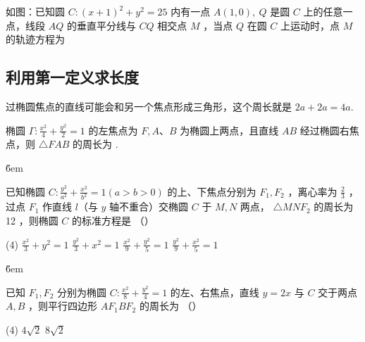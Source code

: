 \vspace{10em}

\begin{example}
    如图：已知圆 $C:(x+1)^2+y^2=25$ 内有一点 $A(1,0), ~ Q$ 是圆 $C$ 上的任意一点，线段 $A Q$ 的垂直平分线与 $C Q$ 相交点 $M$ ，当点 $Q$ 在圆 $C$ 上运动时，点 $M$ 的轨迹方程为 \underline{\qquad}
\end{example}

\begin{figure} [H]
    \centering
    \resizebox{0.25\textwidth}{!}{}
\end{figure}

\subsection{利用第一定义求长度}

\begin{theorem}[椭圆中的 $4a$ 周长]
    过椭圆焦点的直线可能会和另一个焦点形成三角形，这个周长就是 $2a + 2a = 4a$.
\end{theorem}

\begin{example}
    椭圆 $\Gamma: \frac{x^2}{4}+\frac{y^2}{2}=1$ 的左焦点为 $F,A $、$B$ 为椭圆上两点，且直线 $A B$ 经过椭圆右焦点，则 $\triangle F A B$ 的周长为 \underline{\qquad}.
\end{example}

\v{6em}

\begin{example}
    已知椭圆 $C: \frac{y^2}{a^2}+\frac{x^2}{b^2}=1(a>b>0)$ 的上、下焦点分别为 $F_1, F_2$ ，离心率为 $\frac{2}{3}$ ，过点 $F_1$ 作直线 $l$（与 $y$ 轴不重合）交椭圆 $C$ 于 $M, N$ 两点， $\triangle M N F_2$ 的周长为 12 ，则椭圆 $C$ 的标准方程是 （\qquad）
    \begin{tasks}(4)
        \task $\frac{x^2}{3}+y^2=1$
        \task $\frac{y^2}{3}+x^2=1$
        \task $\frac{x^2}{9}+\frac{y^2}{5}=1$
        \task $\frac{y^2}{9}+\frac{x^2}{5}=1$
    \end{tasks}
\end{example}

\v{6em}

\begin{example}
    已知 $F_1, F_2$ 分别为椭圆 $C: \frac{x^2}{8}+\frac{y^2}{4}=1$ 的左、右焦点，直线 $y=2 x$ 与 $C$ 交于两点 $A, B$ ，则平行四边形 $A F_1 B F_2$ 的周长为 （\qquad）
    \begin{tasks}(4)
        \task $4 \sqrt{2}$
        \task $8 \sqrt{2}$
    \end{tasks}
\end{example}

